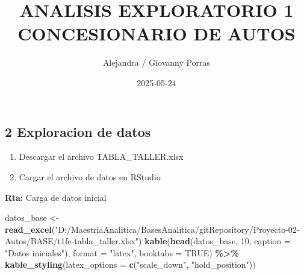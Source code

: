 \documentclass[
]{article}
\title{ANALISIS EXPLORATORIO 1 CONCESIONARIO DE AUTOS}
\author{Alejandra / Giovanny Porras}
\date{2025-05-24}
\newenvironment{Shaded}{\begin{snugshade}}{\end{snugshade}}
\newcommand{\AttributeTok}[1]{\textcolor[rgb]{0.13,0.29,0.53}{#1}}
\newcommand{\ConstantTok}[1]{\textcolor[rgb]{0.56,0.35,0.01}{#1}}
\newcommand{\DecValTok}[1]{\textcolor[rgb]{0.00,0.00,0.81}{#1}}
\newcommand{\FunctionTok}[1]{\textcolor[rgb]{0.13,0.29,0.53}{\textbf{#1}}}
\newcommand{\NormalTok}[1]{#1}
\newcommand{\OtherTok}[1]{\textcolor[rgb]{0.56,0.35,0.01}{#1}}
\newcommand{\SpecialCharTok}[1]{\textcolor[rgb]{0.81,0.36,0.00}{\textbf{#1}}}
\newcommand{\StringTok}[1]{\textcolor[rgb]{0.31,0.60,0.02}{#1}}
\providecommand{\tightlist}{%
  \setlength{\itemsep}{0pt}\setlength{\parskip}{0pt}}
\begin{document}
\maketitle

{
\setcounter{tocdepth}{2}
\tableofcontents
}
\subsection{2 Exploracion de datos}\label{exploracion-de-datos}

\begin{enumerate}
\def\labelenumi{\alph{enumi}.}
\tightlist
\item
  Descargar el archivo TABLA\_TALLER.xlsx
\item
  Cargar el archivo de datos en RStudio
\end{enumerate}

\textbf{Rta:} Carga de datos inicial

\begin{Shaded}
\begin{Highlighting}[]
\NormalTok{datos\_base }\OtherTok{\textless{}{-}} \FunctionTok{read\_excel}\NormalTok{(}\StringTok{"D:/MaestriaAnalitica/BasesAnalitica/gitRepository/Proyecto{-}02{-}Autos/BASE/t1fe{-}tabla\_taller.xlsx"}\NormalTok{)}
\FunctionTok{kable}\NormalTok{(}\FunctionTok{head}\NormalTok{(datos\_base, }\DecValTok{10}\NormalTok{,  }\AttributeTok{caption =} \StringTok{"Datos iniciales"}\NormalTok{), }\AttributeTok{format =} \StringTok{"latex"}\NormalTok{, }\AttributeTok{booktabs =} \ConstantTok{TRUE}\NormalTok{) }\SpecialCharTok{\%\textgreater{}\%} 
  \FunctionTok{kable\_styling}\NormalTok{(}\AttributeTok{latex\_options =} \FunctionTok{c}\NormalTok{(}\StringTok{"scale\_down"}\NormalTok{, }\StringTok{"hold\_position"}\NormalTok{))}
\end{Highlighting}
\end{Shaded}
\end{document}
